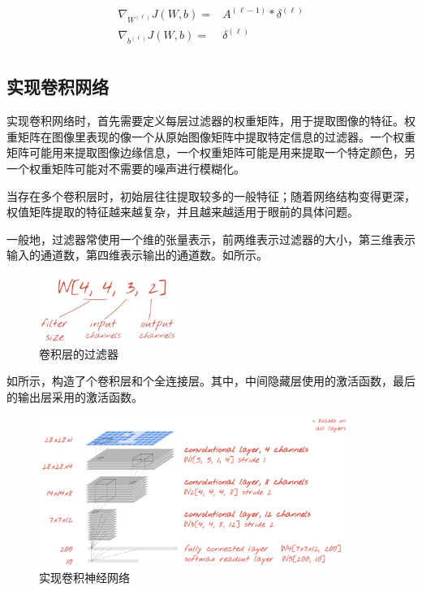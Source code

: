 \begin{content}
\begin{content}
\[\begin{aligned}
  {\nabla _{{W^{(\ell )}}}}J(W,b) =  & {A^{(\ell  - 1)}} * {\delta ^{(\ell )}} \\ 
  {\nabla _{{b^{(\ell )}}}}J(W,b) =  & {\delta ^{(\ell )}} \\ 
\end{aligned} \]

\subsection{实现卷积网络}

实现卷积网络时，首先需要定义每层过滤器的权重矩阵，用于提取图像的特征。权重矩阵在图像里表现的像一个从原始图像矩阵中提取特定信息的过滤器。一个权重矩阵可能用来提取图像边缘信息，一个权重矩阵可能是用来提取一个特定颜色，另一个权重矩阵可能对不需要的噪声进行模糊化。

当存在多个卷积层时，初始层往往提取较多的一般特征；随着网络结构变得更深，权值矩阵提取的特征越来越复杂，并且越来越适用于眼前的具体问题。

一般地，过滤器常使用一个维的张量表示，前两维表示过滤器的大小，第三维表示输入的通道数，第四维表示输出的通道数。如所示。

\begin{figure}[H]
\centering
\includegraphics[width=0.4\textwidth]{figures/mnist-filter.png}
\caption{卷积层的过滤器}
 \label{fig:mnist-filter}
\end{figure}

如所示，构造了个卷积层和个全连接层。其中，中间隐藏层使用的激活函数，最后的输出层采用的激活函数。

\begin{figure}[H]
\centering
\includegraphics[width=0.9\textwidth]{figures/mnist-conv2d-1.png}
\caption{实现卷积神经网络}
 \label{fig:mnist-conv2d-1}
\end{figure}


\end{content}
\end{content}
